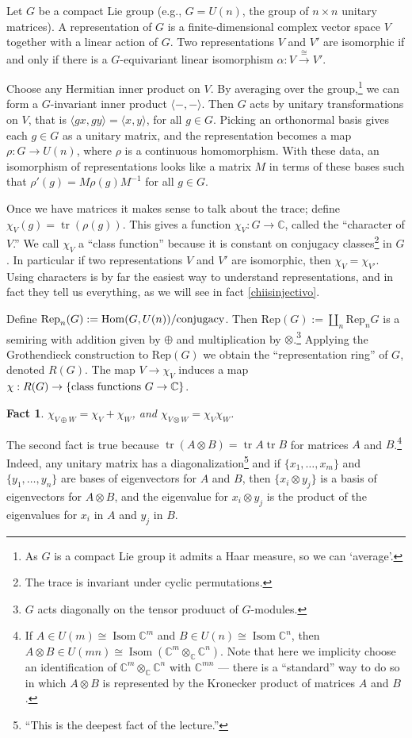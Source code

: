 \documentclass{article}
\newcommand{\C}{\mathbb{C}}
\DeclareMathOperator{\tr}{tr}
\DeclareMathOperator{\Hom}{Hom}
\newtheorem{fact}[thm]{Fact}
\begin{document}
Let $G$ be a compact Lie group (e.g., $G=U(n)$, the group of $n\times n$ unitary matrices).  A representation of $G$ is a finite-dimensional complex vector space $V$ together with a linear action of $G$.  Two representations $V$ and $V'$ are isomorphic if and only if there is a $G$-equivariant linear isomorphism $\alpha: V \stackrel{\cong}{\to} V'$.

Choose any Hermitian inner product on $V$.  By averaging over the group,\footnote{As $G$ is a compact Lie group it admits a Haar measure, so we can `average'.} we can form a $G$-invariant inner product $\langle - , - \rangle$. Then $G$ acts by unitary transformations on $V$, that is $\langle gx, gy \rangle = \langle x, y \rangle$, for all $g\in G$.  Picking an orthonormal basis gives each $g\in G$ as a unitary matrix, and the representation becomes a map $\rho: G \to U(n)$, where $\rho$ is a continuous homomorphism.  With these data, an isomorphism of representations looks like a matrix $M$ in terms of these bases such that $\rho'(g) = M \rho(g) M^{-1}$ for all $g \in G$.

Once we have matrices it makes sense to talk about the trace; define $\chi_V(g) = \tr(\rho(g))$.  This gives a function $\chi_V: G \to \C$, called the ``character of $V$.''  We call $\chi_V$ a ``class function'' because it is constant on conjugacy classes\footnote{The trace is invariant under cyclic permutations.} in $G$.  In particular if two representations $V$ and $V'$ are isomorphic, then $\chi_V = \chi_{V'}$.
Using characters is by far the easiest way to understand representations, and in fact they tell us everything, as we will see in fact \ref{chiisinjectivo}.

Define $\mathrm{Rep}_n(G) := \Hom(G, U(n)) /\textup{conjugacy}$.  Then $\mathrm{Rep}(G) := \coprod_n \mathrm{Rep}_n G$ is a semiring with addition given by $\oplus$ and multiplication by $\otimes$.\footnote{$G$ acts diagonally on the tensor produuct of $G$-modules.} Applying the Grothendieck construction to $\mathrm{Rep}(G)$ we obtain the ``representation ring'' of $G$, denoted $R(G)$.  The map $V \to \chi_V$ induces a map $\chi: R(G) \to \{\hbox{class functions $G \to \C$}\}$.

\begin{fact}
$\chi_{V \oplus W} = \chi_V + \chi_W$, and $\chi_{V \otimes W} = \chi_V \chi_W$.
\end{fact}
The second fact is true because $\tr(A \otimes B) = \tr A \tr B$ for matrices $A$ and $B$.\footnote{If $A \in U(m) \cong \operatorname{Isom} \C^m$ and $B \in U(n) \cong \operatorname{Isom} \C^n$, then $A \otimes B \in U(mn) \cong \operatorname{Isom} (\C^m \otimes_\C \C^n)$. Note that here we implicity choose an identification of $\C^m\otimes_\C\C^n$ with $\C^{mn}$ --- there is a ``standard'' way to do so in which $A\otimes B$ is represented by the Kronecker product of matrices $A$ and $B$.}  Indeed, any unitary matrix has a diagonalization\footnote{``This is the deepest fact of the lecture.''} and if $\{x_1, \ldots, x_m\}$ and $\{y_1, \ldots, y_n\}$ are bases of eigenvectors for $A$ and $B$, then $\{x_i \otimes y_j\}$ is a basis of eigenvectors for $A \otimes B$, and the eigenvalue for $x_i \otimes y_j$ is the product of the eigenvalues for $x_i$ in $A$ and $y_j$ in $B$.
\end{document}
